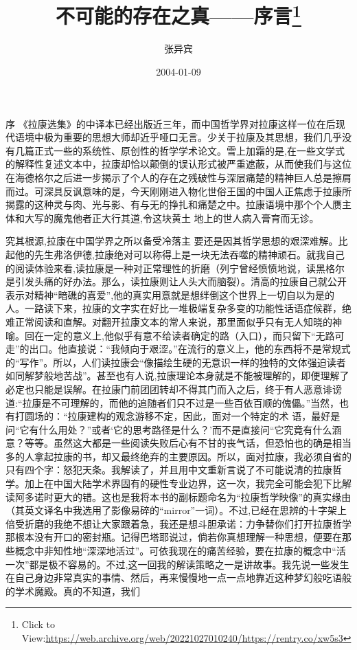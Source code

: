 \documentclass{article}
\title{不可能的存在之真——序言\footnote{Click to View:\url{https://web.archive.org/web/20221027010240/https://rentry.co/xw5s3}}}
\author{张异宾}
\date{2004-01-09}
\begin{document}

\maketitle


\Large

﻿序 《拉康选集》的中译本已经出版近三年，而中国哲学界对拉康这样一位在后现代语境中极为重要的思想大师却近乎哑口无言。少关于拉康及其思想，我们几乎没有几篇正式一些的系统性、原创性的哲学学术论文。雪上加霜的是,在一些文学式的解释性复述文本中，拉康却恰以颠倒的误认形式被严重遮蔽，从而使我们与这位在海德格尔之后进一步揭示了个人的存在之残破性与深层痛楚的精神巨人总是擦肩而过。可深具反讽意味的是，今天刚刚进入物化世俗王国的中国人正焦虑于拉康所揭露的这种灵与肉、光与影、有与无的挣扎和痛楚之中。拉康语境中那个个人赝主体和大写的魔鬼他者正大行其道,令这块黄土
地上的世人病入膏育而无诊。 

究其根源,拉康在中国学界之所以备受冷落主
\newpage
要还是因其哲学思想的艰深难解。比起他的先生弗洛伊德,拉康绝对可以称得上是一块无法吞噬的精神顽石。就我自己的阅读体验来看,读拉康是一种对正常理性的折磨（列宁曾经愤愤地说，读黑格尔是引发头痛的好办法。那么，读拉康则让人头大而脑裂）。清高的拉康自己就公开表示对精神“暗礁的喜爱”,他的真实用意就是想绊倒这个世界上一切自以为是的人。一路读下来，拉康的文字实在好比一堆极端复杂多变的功能性话语症候群，绝难正常阅读和直解。对翻开拉康文本的常人来说，那里面似乎只有无人知晓的神喻。回在一定的意义上,他似乎有意不给读者确定的路（入口），而只留下“无路可走”的出口。他直接说：“我倾向于艰涩。”在流行的意义上，他的东西将不是常规式的“写作”。所以，人们读拉康会“像描绘生硬的无意识一样的独特的文体强迫读者如同解梦般地苦战”。甚至也有人说,拉康理论本身就是不能被理解的，即便理解了必定也只能是误解。在拉康门前团团转却不得其门而入之后，终于有人恶意诽谤道:“拉康是不可理解的，而他的追随者们只不过是一些百依百顺的傀儡。”当然，也有打圆场的：“拉康建构的观念游移不定，因此，面对一个特定的术
\newpage
语，最好是问“它有什么用处？”或者‘它的思考路径是什么？’而不是直接问“它究竟有什么涵意？等等。虽然这大都是一些阅读失败后心有不甘的丧气话，但恐怕也的确是相当多的人拿起拉康的书，却又最终绝弃的主要原因。所以，面对拉康，我必须自省的只有四个字：怒犯天条。我解读了，并且用中文重新言说了不可能说清的拉康哲学。加上在中国大陆学术界固有的硬性专业边界，这一次，我完全可能会犯下比解读阿多诺时更大的错。这也是我将本书的副标题命名为“拉康哲学映像”的真实缘由（其英文译名中我选用了影像易碎的“mirror”一词）。不过,已经在思辨的十字架上倍受折磨的我绝不想让大家跟着急，我还是想斗胆承诺：力争替你们打开拉康哲学那根本没有开口的密封瓶。记得巴塔耶说过，倘若你真想理解一种思想，便要在那些概念中非知性地“深深地活过”。可依我现在的痛苦经验，要在拉康的概念中“活一次”都是极不容易的。不过,这一回我的解读策略之一是讲故事。我先说一些发生在自己身边非常真实的事情、然后，再来慢慢地一点一点地靠近这种梦幻般吃语般的学术魔殿。真的不知道，我们
\end{document}
